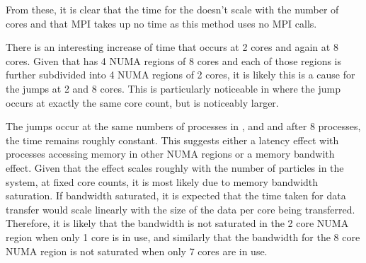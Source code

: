 \begin{figure}[!h]
    
    \caption{}
    \label{fig:v0_replicated_individual_operation_4096_time}
\end  {figure}

\begin{figure}[!h]
    
    \caption{}
    \label{fig:v0_replicated_individual_operation_32768_time}
\end  {figure}


\vZeroTimeExplanation
    {}
    {}
    {}
    {\individualoperation{}}
    {\replicateddata{}}


From these, it is clear that
the time for the \individualoperation{} doesn't scale with the number
of cores and that MPI takes up no time as this method uses no MPI calls.

There is an interesting increase of time that occurs at 2 cores and again
at 8 cores.
%
Given that \hector{} has 4 NUMA regions of 8 cores and each of those
regions is further subdivided into 4 NUMA regions of 2 cores,
it is likely this is a cause for the jumps at 2 and 8 cores.
%
This is particularly noticeable in
where the jump occurs at exactly the same core count, but is noticeably larger.

The jumps occur at the same numbers of processes in
,
 and
and after 8 processes, the time remains roughly constant.
%
This suggests either a latency effect with processes accessing memory
in other NUMA regions or a memory bandwith effect.
%
Given that the effect scales roughly with the number of particles
in the system, at fixed core counts, it is most likely due to
memory bandwidth saturation.
%
If bandwidth saturated, it is expected that the time taken for
data transfer would
scale linearly with the size of the data per core being transferred.
%
Therefore, it is likely that the bandwidth is not saturated in the 2 core NUMA
region when only 1 core is in use, and
similarly that the bandwidth for the 8 core NUMA region is not saturated
when only 7 cores are in use.


